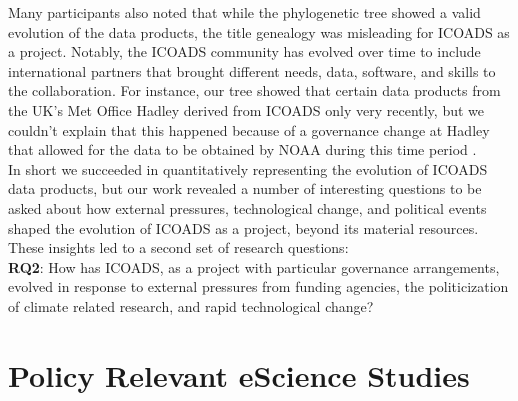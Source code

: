 \documentclass[thesis,tocnosub,noragright,centerchapter,12pt]{uiucecethesis09}
\begin{document}
Many participants also noted that while the phylogenetic tree showed a
valid evolution of the data products, the title genealogy was misleading
for ICOADS as a project. Notably, the ICOADS community has evolved over
time to include international partners that brought different needs,
data, software, and skills to the collaboration. For instance, our tree
showed that certain data products from the UK's Met Office Hadley
derived from ICOADS only very recently, but we couldn't explain that
this happened because of a governance change at Hadley that allowed for
the data to be obtained by NOAA during this time period \citep{parker2004second}.\\

In short we succeeded in quantitatively representing the evolution of
ICOADS data products, but our work revealed a number of interesting questions
to be asked about how external pressures, technological change, and
political events shaped the evolution of ICOADS as a project, beyond its
material resources. These insights led to a second set of research
questions:\\

\textbf{RQ2}: How has ICOADS, as a  project with particular
governance arrangements, evolved in response to external pressures from
funding agencies, the politicization of climate related research,
and rapid technological change?\\

\section{Policy Relevant eScience Studies}\\
\end{document}
